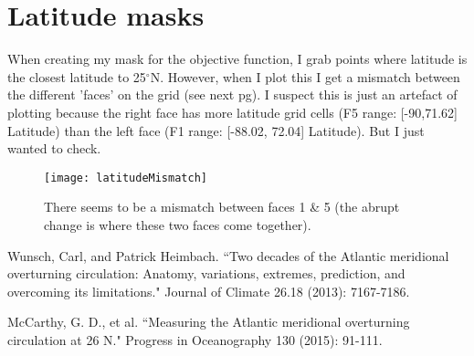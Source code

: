 \documentclass[a4paper,11pt]{article}
\newcommand{\red}[1]{\textcolor{red}{#1}}
\begin{document}
  
  


  
  
\section{Latitude masks}
  
  When creating my mask for the objective function, I grab points where latitude is the closest latitude to 25$^{\circ}$N. However, when I plot this I get a mismatch between the different 'faces' on the grid (see next pg). I suspect this is just an artefact of plotting because the right face has more latitude grid cells (F5 range: [-90,71.62] Latitude) than the left face (F1 range: [-88.02, 72.04] Latitude). But I just wanted to check.
  
  \begin{figure}
   \centering
   \texttt{[image: latitudeMismatch]}
   \label{fig:latitudeMismatch}
   \caption{There seems to be a mismatch between faces 1 \& 5 (the abrupt change is where these two faces come together).}
  \end{figure}


  
\begin{thebibliography}{3}

  Wunsch, Carl, and Patrick Heimbach. ``Two decades of the Atlantic meridional overturning circulation: Anatomy, variations, extremes, prediction, and overcoming its limitations." Journal of Climate 26.18 (2013): 7167-7186.
  
  McCarthy, G. D., et al. ``Measuring the Atlantic meridional overturning circulation at 26 N." Progress in Oceanography 130 (2015): 91-111.

\end{thebibliography}
\end{document}
